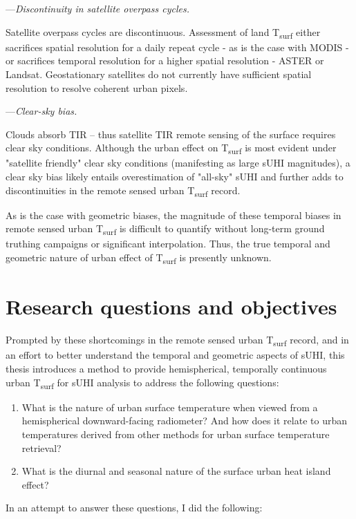 \begin{bibunit}
\noindent---\textit{Discontinuity in satellite overpass cycles.}

Satellite overpass cycles are discontinuous. Assessment of land T\textsubscript{surf} either sacrifices spatial resolution for a daily repeat cycle - as is the case with MODIS  - or sacrifices temporal resolution for a higher spatial resolution - ASTER or Landsat. Geostationary satellites do not currently have sufficient spatial resolution to resolve coherent urban pixels.

\noindent---\textit{Clear-sky bias.}

Clouds absorb TIR – thus satellite TIR remote sensing of the surface requires clear sky conditions. Although the urban effect on T\textsubscript{surf} is most evident under "satellite friendly" clear sky conditions (manifesting as large sUHI magnitudes), a clear sky bias likely entails overestimation of "all-sky" sUHI and further adds to discontinuities in the remote sensed urban T\textsubscript{surf} record.

As is the case with geometric biases, the magnitude of these temporal biases in remote sensed urban T\textsubscript{surf} is difficult to quantify without long-term ground truthing campaigns or significant interpolation. Thus, the true temporal and geometric nature of urban effect of T\textsubscript{surf} is presently unknown.
 
\section{Research questions and objectives}

Prompted by these shortcomings in the remote sensed urban T\textsubscript{surf} record, and in an effort to better understand the temporal and geometric aspects of sUHI, this thesis introduces a method to provide hemispherical, temporally continuous urban T\textsubscript{surf} for sUHI analysis to address the following questions:

\begin{enumerate}
	\item What is the nature of urban surface temperature when viewed from a hemispherical downward-facing radiometer? And how does it relate to urban temperatures derived from other methods for urban surface temperature retrieval?
	\item What is the diurnal and seasonal nature of the surface urban heat island effect?
\end{enumerate}

\noindent In an attempt to answer these questions, I did the following:


\end{bibunit}
